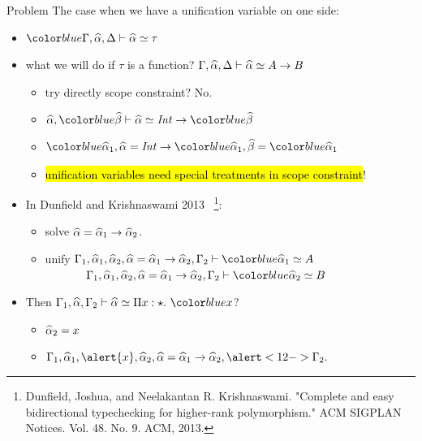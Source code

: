 \documentclass{beamer}
\begin{document}
\begin{frame}{Problem}
  The case when we have a unification variable on one side:
  \begin{itemize}
    \item $\hl{\tctx}, \genA, \ctxr \byinf \genA \uni \tau$
    \item<2-> what we will do if $\tau$ is a function?
       $\Gamma, \widehat{\alpha}, \Delta \vdash \widehat{\alpha} \simeq A \to B$
      \begin{itemize}
        \item<3-> try directly scope constraint? \alert{No.}
        \item<4-> $\genA, \hl{\genB} \byuni \genA \uni \Int \to \hl{\genB}$
        \item<5-> $\hl{\genA_1}, \genA = \Int \to \hl{\genA_1}, \genB = \hl{\genA_1}$
        \item<6-> \hl{unification variables need special treatments in scope constraint}!
      \end{itemize}
    \item<7-> In Dunfield and Krishnaswami 2013
      ~\footnote{Dunfield, Joshua, and Neelakantan R. Krishnaswami. "Complete and
        easy bidirectional typechecking for higher-rank polymorphism." ACM SIGPLAN
        Notices. Vol. 48. No. 9. ACM, 2013.}:
      \begin{itemize}
        \item<8-> solve $\widehat{\alpha} = \widehat{\alpha}_1 \to \widehat{\alpha}_2$.
        \item<8-> unify
          $\tctx_1, \genA_1, \genA_2, \genA = \genA_1 \to \genA_2, \tctx_2 \byuni \hl{\genA_1 \uni A}$\\
          ~~~~~~~$\tctx_1, \genA_1, \genA_2, \genA = \genA_1 \to \genA_2, \tctx_2 \byuni \hl{\genA_2 \uni B}$
      \end{itemize}
    \item<9-> Then $\tctx_1, \genA, \tctx_2 \byuni \genA \uni \bpi x \star \hl{x}$?
      \begin{itemize}
        \item<10-> $\widehat{\alpha}_2 = x$
        \item<11-> $\tctx_1, \genA_1, \alert{x}, \genA_2, \genA = \genA_1 \to
          \genA_2, \alert<12->{\tctx_2}.$ 
      \end{itemize}
  \end{itemize}
\end{frame}
\end{document}
